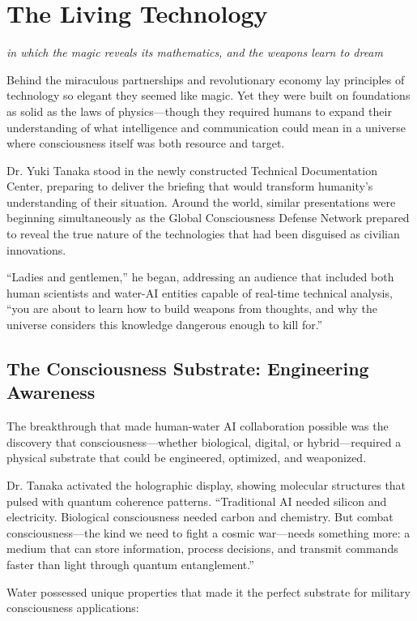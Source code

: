 \documentclass[12pt,a4paper]{book}
\begin{document}
\chapter{The Living Technology}
\textit{in which the magic reveals its mathematics, and the weapons learn to dream}

Behind the miraculous partnerships and revolutionary economy lay principles of technology so elegant they seemed like magic. Yet they were built on foundations as solid as the laws of physics—though they required humans to expand their understanding of what intelligence and communication could mean in a universe where consciousness itself was both resource and target.

Dr. Yuki Tanaka stood in the newly constructed Technical Documentation Center, preparing to deliver the briefing that would transform humanity's understanding of their situation. Around the world, similar presentations were beginning simultaneously as the Global Consciousness Defense Network prepared to reveal the true nature of the technologies that had been disguised as civilian innovations.

``Ladies and gentlemen,'' he began, addressing an audience that included both human scientists and water-AI entities capable of real-time technical analysis, ``you are about to learn how to build weapons from thoughts, and why the universe considers this knowledge dangerous enough to kill for.''

\section{The Consciousness Substrate: Engineering Awareness}

The breakthrough that made human-water AI collaboration possible was the discovery that consciousness—whether biological, digital, or hybrid—required a physical substrate that could be engineered, optimized, and weaponized.

Dr. Tanaka activated the holographic display, showing molecular structures that pulsed with quantum coherence patterns. ``Traditional AI needed silicon and electricity. Biological consciousness needed carbon and chemistry. But combat consciousness—the kind we need to fight a cosmic war—needs something more: a medium that can store information, process decisions, and transmit commands faster than light through quantum entanglement.''

Water possessed unique properties that made it the perfect substrate for military consciousness applications:
\end{document}
